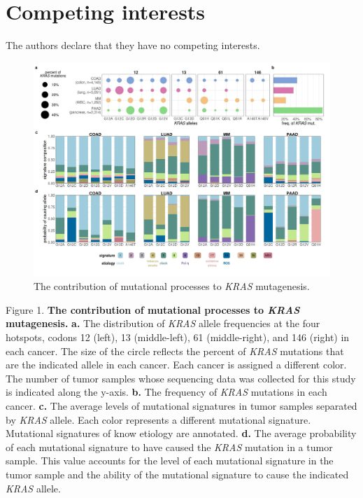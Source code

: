 \documentclass[english, 10pt, letterpaper]{article}
\newcommand{\KRAS}{\emph{KRAS}}
\begin{document}
\section*{Competing interests}

The authors declare that they have no competing interests.





{}

\newpage



\begin{figure}[h!]
\centering
\includegraphics[width=180mm]{figures/Fig_1.jpeg}
\caption{The contribution of mutational processes to \KRAS{} mutagenesis.}
\label{fig:mutational-signatures-main}
\end{figure}
\newpage
\newpage
\noindent Figure 1. \textbf{The contribution of mutational processes to \KRAS{} mutagenesis.}
\textbf{a.} The distribution of \KRAS{} allele frequencies at the four hotspots, codons 12 (left), 13 (middle-left), 61 (middle-right), and 146 (right) in each cancer. The size of the circle reflects the percent of \KRAS{} mutations that are the indicated allele in each cancer. Each cancer is assigned a different color. The number of tumor samples whose sequencing data was collected for this study is indicated along the y-axis. 
\textbf{b.} The frequency of \KRAS{} mutations in each cancer.
\textbf{c.} The average levels of mutational signatures in tumor samples separated by \KRAS{} allele. Each color represents a different mutational signature. Mutational signatures of know etiology are annotated.
\textbf{d.} The average probability of each mutational signature to have caused the \KRAS{} mutation in a tumor sample. This value accounts for the level of each mutational signature in the tumor sample and the ability of the mutational signature to cause the indicated \KRAS{} allele.
\newpage
\end{document}
